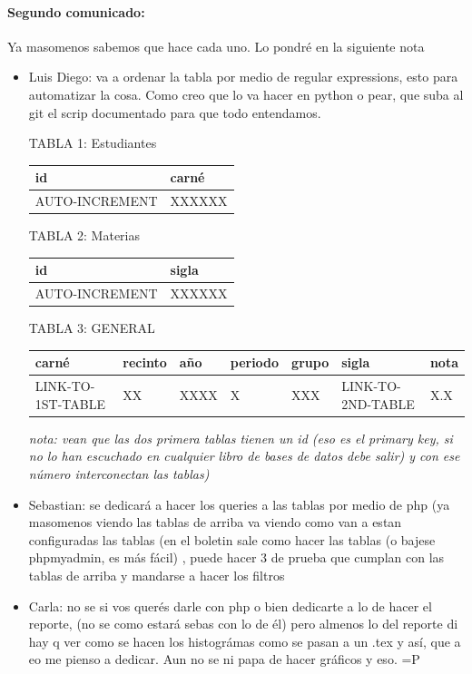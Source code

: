 \documentclass[11pt]{article} %
\begin{document}
\paragraph{Segundo comunicado:}
Ya masomenos sabemos que hace cada uno. Lo pondré en la siguiente nota
\begin{itemize}
\item Luis Diego: va a ordenar la tabla por medio de regular expressions, esto para automatizar la cosa. Como creo que lo va hacer en python o pear, que suba al git el scrip documentado para que todo entendamos.\\
\begin{shaded}
\begin{center}
	TABLA 1: Estudiantes\\
    \begin{tabular}{ | l | l |}
    \hline
    id & carné \\ \hline
    AUTO-INCREMENT & XXXXXX   \\
    \hline
    \end{tabular}
\end{center}

\begin{center}
	TABLA 2: Materias\\
    \begin{tabular}{ | l | l |}
    \hline
    id & sigla \\ \hline
    AUTO-INCREMENT & XXXXXX \\ 
    \hline
    \end{tabular}
\end{center}

\begin{center}
	TABLA 3: GENERAL\\
    \begin{tabular}{ | l | l || l | l | l | l | l |}
    \hline
    carné & recinto & año & periodo & grupo & sigla & nota \\ \hline
    LINK-TO-1ST-TABLE & XX & XXXX & X & XXX & LINK-TO-2ND-TABLE  & X.X \\
    \hline
    \end{tabular}
\end{center}
\textit{nota: vean que las dos primera tablas tienen un id (eso es el primary key, si no lo han escuchado en cualquier libro de bases de datos debe salir) y con ese número interconectan las tablas)}
\end{shaded}
\item Sebastian: se dedicará a hacer los queries a las tablas por medio de php (ya masomenos viendo las tablas de arriba va viendo como van a estan configuradas las tablas (en el boletin sale como hacer las tablas (o bajese phpmyadmin, es más fácil) , puede hacer 3 de prueba que cumplan con las tablas de arriba y mandarse a hacer los filtros
\item Carla: no se si vos querés darle con php o bien dedicarte a lo de hacer el reporte, (no se como estará sebas con lo de él) pero almenos lo del reporte di hay q ver como se hacen los histográmas como se pasan a un .tex y así, que a eo me pienso a dedicar. Aun no se ni papa de hacer gráficos y eso. =P
\end{itemize}
\end{document}
